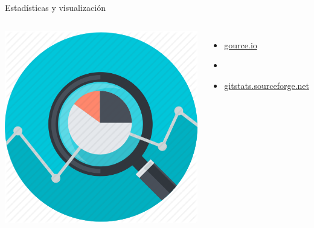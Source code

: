 \begin{frame}{Estadísticas y visualización}
  \begin{columns}[onlytextwidth]
      \includegraphics[scale=0.23]{images/analysis}
    \begin{itemize}
      \item[] \href{http://gource.io}{\Large{gource.io}}
      \item[]
      \item[] \href{http://gitstats.sourceforge.net}{\Large{gitstats.sourceforge.net}}
    \end{itemize}
  \end{columns}
\end{frame}
